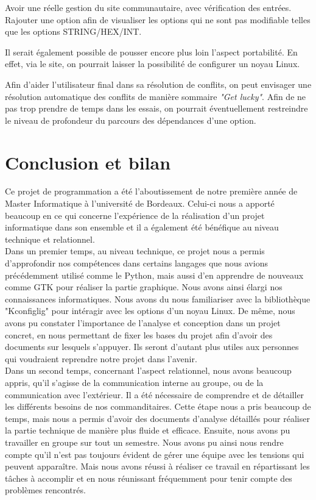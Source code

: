 \documentclass[16pts]{report}
\begin{document}
    Avoir une réelle gestion du site communautaire, avec vérification des entrées.
    Rajouter une option afin de visualiser les options qui ne sont pas modifiable
        telles que les options STRING/HEX/INT.

    Il serait également possible de pousser encore plus loin l'aspect portabilité.
    En effet, via le site, on pourrait laisser la possibilité de configurer un
    noyau Linux.

    Afin d'aider l'utilisateur final dans sa résolution de conflits, on peut
    envisager une résolution automatique des conflits de manière sommaire
    \textit{"Get lucky"}.  Afin de ne pas trop prendre de temps dans les
    essais, on pourrait éventuellement restreindre le niveau de profondeur du
    parcours des dépendances d'une option.

\chapter{Conclusion et bilan}
\label{cha:Conclusion et bilan}

Ce projet de programmation a été l'aboutissement de notre première année 
de Master Informatique à l'université de Bordeaux. Celui-ci nous a apporté 
beaucoup en ce qui concerne l'expérience de la réalisation d'un projet 
informatique dans son ensemble et il a également été bénéfique au niveau 
technique et relationnel.\\

Dans un premier temps, au niveau technique, ce projet nous a permis 
d'approfondir nos compétences dans certains langages que nous avions 
précédemment utilisé comme le Python, mais aussi d'en apprendre de 
nouveaux comme GTK pour réaliser la partie graphique. Nous avons ainsi 
élargi nos connaissances informatiques. Nous avons du nous familiariser 
avec la bibliothèque "Kconfiglig" pour intéragir avec les options d'un 
noyau Linux. De même, nous avons pu constater l'importance de l'analyse 
et conception dans un projet concret, en nous permettant de fixer les bases 
du projet afin d'avoir des documents sur lesquels s'appuyer. Ils seront 
d'autant plus utiles aux personnes qui voudraient reprendre notre projet 
dans l'avenir.\\

Dans un second temps, concernant l'aspect relationnel, nous avons beaucoup 
appris, qu'il s'agisse de la communication interne au groupe, ou de la 
communication avec l'extérieur. Il a été nécessaire de comprendre et de 
détailler les différents besoins de nos commanditaires. Cette étape nous 
a pris beaucoup de temps, mais nous a permis d'avoir des documents d'analyse 
détaillés pour réaliser la partie technique de manière plus fluide et efficace. 
Ensuite, nous avons pu travailler en groupe sur tout un semestre. Nous 
avons pu ainsi nous rendre compte qu'il n'est pas toujours évident de gérer 
une équipe avec les tensions qui peuvent apparaître. Mais nous avons réussi à 
réaliser ce travail en répartissant les tâches à accomplir et en nous 
réunissant fréquemment pour tenir compte des problèmes rencontrés.\\
\end{document}
